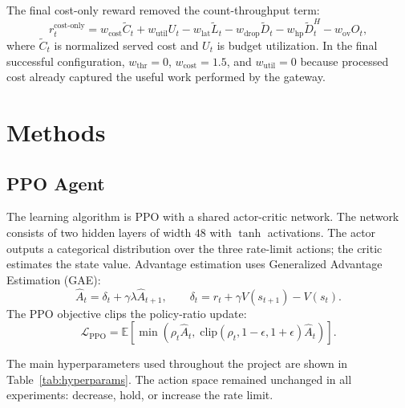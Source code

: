 \documentclass[conference]{IEEEtran}
\begin{document}
The final cost-only reward removed the count-throughput term:
\begin{equation}
r_t^{\text{cost-only}} =
w_{\text{cost}}\tilde{C}_t
+ w_{\text{util}} U_t
- w_{\text{lat}}\tilde{L}_t
- w_{\text{drop}}\tilde{D}_t
- w_{\text{hp}}\tilde{D}^{H}_t
- w_{\text{ov}} O_t ,
\end{equation}
where $\tilde{C}_t$ is normalized served cost and $U_t$ is budget utilization. In the final successful configuration, $w_{\text{thr}}=0$, $w_{\text{cost}}=1.5$, and $w_{\text{util}}=0$ because processed cost already captured the useful work performed by the gateway.

\section{Methods}
\subsection{PPO Agent}
The learning algorithm is PPO with a shared actor-critic network. The network consists of two hidden layers of width $48$ with $\tanh$ activations. The actor outputs a categorical distribution over the three rate-limit actions; the critic estimates the state value. Advantage estimation uses Generalized Advantage Estimation (GAE):
\begin{equation}
\hat{A}_t = \delta_t + \gamma \lambda \hat{A}_{t+1},
\qquad
\delta_t = r_t + \gamma V(s_{t+1}) - V(s_t).
\end{equation}
The PPO objective clips the policy-ratio update:
\begin{equation}
\mathcal{L}_{\text{PPO}} =
\mathbb{E}\left[
\min\left(
\rho_t \hat{A}_t,\;
\text{clip}(\rho_t, 1-\epsilon, 1+\epsilon)\hat{A}_t
\right)
\right].
\end{equation}

The main hyperparameters used throughout the project are shown in Table~\ref{tab:hyperparams}. The action space remained unchanged in all experiments: decrease, hold, or increase the rate limit.
\end{document}
